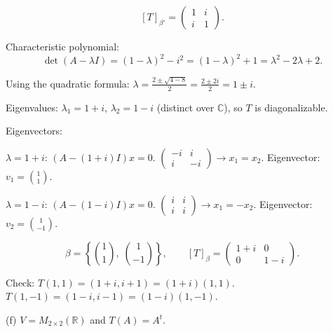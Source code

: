 \documentclass{article}
\begin{document}
\begin{mdframed}[linewidth=1pt]
\[
[T]_{\beta'} = \begin{pmatrix} 1 & i \\ i & 1 \end{pmatrix}.
\]

\textnormal{Characteristic polynomial:}
\[
\det(A - \lambda I) = (1-\lambda)^2 - i^2 = (1-\lambda)^2 + 1 = \lambda^2 - 2\lambda + 2.
\]

Using the quadratic formula: $\lambda = \frac{2 \pm \sqrt{4 - 8}}{2} = \frac{2 \pm 2i}{2} = 1 \pm i$.

Eigenvalues: $\lambda_1 = 1+i$, $\lambda_2 = 1-i$ (distinct over $\mathbb{C}$), so $T$ is \textnormal{diagonalizable}.

\textnormal{Eigenvectors:}

$\lambda = 1+i$: $(A - (1+i)I)x = 0$. $\begin{pmatrix}-i & i \\ i & -i\end{pmatrix} \to x_1 = x_2$. Eigenvector: $v_1 = \binom{1}{1}$.

$\lambda = 1-i$: $(A - (1-i)I)x = 0$. $\begin{pmatrix}i & i \\ i & i\end{pmatrix} \to x_1 = -x_2$. Eigenvector: $v_2 = \binom{1}{-1}$.

\[
\boxed{\beta = \left\{\binom{1}{1},\; \binom{1}{-1}\right\}, \qquad [T]_\beta = \begin{pmatrix} 1+i & 0 \\ 0 & 1-i \end{pmatrix}.}
\]

\textnormal{Check:} $T(1,1) = (1+i, i+1) = (1+i)(1,1)$. $T(1,-1) = (1-i, i-1) = (1-i)(1,-1)$.\end{mdframed}

\bigskip

\noindent\textnormal{(f)} $V = M_{2\times 2}(\mathbb{R})$ and $T(A) = A^t$.
\end{document}
